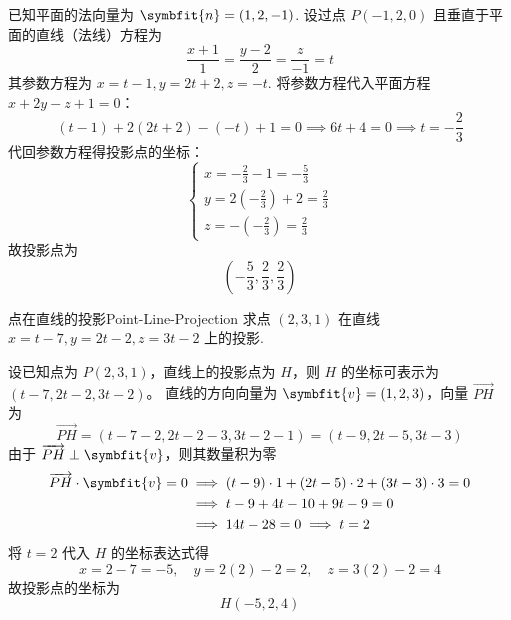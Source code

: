 \begin{solution}
    已知平面的法向量为 $\symbfit{n} = (1, 2, -1)$.
    设过点 $P(-1, 2, 0)$ 且垂直于平面的直线（法线）方程为
    \begin{equation}
        \frac{x + 1}{1} = \frac{y - 2}{2} = \frac{z}{-1} = t
    \end{equation}
    其参数方程为 $x = t - 1, y = 2t + 2, z = -t$.
    将参数方程代入平面方程 $x + 2y - z + 1 = 0$：
    \begin{equation}
        (t - 1) + 2(2t + 2) - (-t) + 1 = 0 \implies 6t + 4 = 0 \implies t = -\frac{2}{3}
    \end{equation}
    代回参数方程得投影点的坐标：
    \begin{equation}
        \begin{cases} x = -\frac{2}{3} - 1 = -\frac{5}{3} \\ y = 2(-\frac{2}{3}) + 2 = \frac{2}{3} \\ z = -(-\frac{2}{3}) = \frac{2}{3} \end{cases}
    \end{equation}
    故投影点为
    \begin{equation}
        \boxed{\left( -\frac{5}{3}, \frac{2}{3}, \frac{2}{3} \right)}
    \end{equation}
\end{solution}


\begin{problem}{点在直线的投影}{Point-Line-Projection}
    求点 $(2, 3, 1)$ 在直线 $x = t - 7, y = 2t - 2, z = 3t - 2$ 上的投影.
\end{problem}

\begin{solution}
    设已知点为 $P(2, 3, 1)$，直线上的投影点为 $H$，则 $H$ 的坐标可表示为 $(t - 7, 2t - 2, 3t - 2)$。
    直线的方向向量为 $\symbfit{v} = (1, 2, 3)$，向量 $\overrightarrow{PH}$ 为
    \begin{equation}
        \overrightarrow{PH} = (t - 7 - 2, 2t - 2 - 3, 3t - 2 - 1) = (t - 9, 2t - 5, 3t - 3)
    \end{equation}
    由于 $\overrightarrow{PH} \perp \symbfit{v}$，则其数量积为零
    \begin{equation}
        \begin{aligned}
            \overrightarrow{PH} \cdot \symbfit{v} = 0
             & \implies (t - 9) \cdot 1 + (2t - 5) \cdot 2 + (3t - 3) \cdot 3 = 0 \\
             & \implies t - 9 + 4t - 10 + 9t - 9 = 0                              \\
             & \implies 14t - 28 = 0 \implies t = 2
        \end{aligned}
    \end{equation}
    将 $t = 2$ 代入 $H$ 的坐标表达式得
    \begin{equation}
        x = 2 - 7 = -5, \quad y = 2(2) - 2 = 2, \quad z = 3(2) - 2 = 4
    \end{equation}
    故投影点的坐标为
    \begin{equation}
        \boxed{H(-5, 2, 4)}
    \end{equation}
\end{solution}


